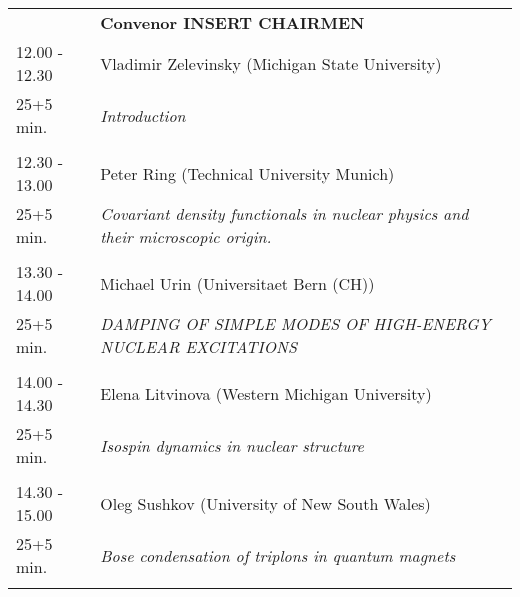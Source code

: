 \begin{longtable}{p{3cm}p{13cm}}
&\hfill {\bf Convenor INSERT CHAIRMEN }\\ 
12.00 - 12.30 & Vladimir Zelevinsky (Michigan State University)\\ 
25+5 min. & {\it Introduction}\\ 
 & \\ 
12.30 - 13.00 & Peter Ring (Technical University Munich)\\ 
25+5 min. & {\it Covariant density functionals in nuclear physics and their microscopic origin.}\\ 
 & \\ 
13.30 - 14.00 & Michael Urin (Universitaet Bern (CH))\\ 
25+5 min. & {\it DAMPING OF SIMPLE MODES OF HIGH-ENERGY NUCLEAR EXCITATIONS}\\ 
 & \\ 
14.00 - 14.30 & Elena Litvinova (Western Michigan University)\\ 
25+5 min. & {\it Isospin dynamics in nuclear structure}\\ 
 & \\ 
14.30 - 15.00 & Oleg Sushkov (University of New South Wales)\\ 
25+5 min. & {\it Bose condensation of triplons in quantum magnets}\\ 
 & \\ 
\end{longtable}

